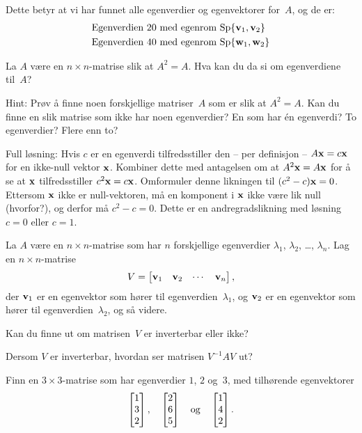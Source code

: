 \begin{losning}
\begin{punkt}
Dette betyr at vi har funnet alle egenverdier og egenvektorer for~$A$,
og de er:
\begin{align*}
&\text{Egenverdien~$20$ med egenrom $\operatorname{Sp} \{ \mathbf{v}_1, \mathbf{v}_2 \}$} \\
&\text{Egenverdien~$40$ med egenrom $\operatorname{Sp} \{ \mathbf{w}_1, \mathbf{w}_2 \}$}
\end{align*}
\end{punkt}
\end{losning}



\begin{oppgave}
La $A$ være en $n\times n$-matrise slik at $A^2=A$.
Hva kan du da si om egenverdiene til~$A$?

\noindent
Hint:
Prøv å finne noen forskjellige matriser~$A$ som er slik at $A^2 = A$.
Kan du finne en slik matrise som ikke har noen egenverdier?
En som har én egenverdi?  To egenverdier?  Flere enn to?
\end{oppgave}

\begin{losning}
Full løsning: Hvis $c$ er en egenverdi tilfredsstiller den -- per definisjon -- $A\mathbf{x}=c\mathbf{x}$ for en ikke-null vektor $\mathbf{x}$. Kombiner dette med antagelsen om at $A^2\mathbf{x}=A\mathbf{x}$ for å se at $\mathbf{x}$ tilfredsstiller $c^2\mathbf{x}=c\mathbf{x}$. Omformuler denne likningen til $(c^2-c)\mathbf{x}=0$. Ettersom $\mathbf{x}$ ikke er null-vektoren, må en komponent i $\mathbf{x}$ ikke være lik null (hvorfor?), og derfor må $c^2-c=0$. Dette er en andregradslikning med løsning $c=0$ eller $c=1$.
\end{losning}



\begin{oppgave}
La $A$ være en $n \times n$-matrise som har $n$ forskjellige
egenverdier
$\lambda_1$, $\lambda_2$, \ldots, $\lambda_n$.
Lag en $n \times n$-matrise
\[
V = \begin{bmatrix} \mathbf{v}_1 & \mathbf{v}_2 & \cdots & \mathbf{v}_n \end{bmatrix},
\]
der $\mathbf{v}_1$ er en egenvektor som hører til egenverdien~$\lambda_1$,
og $\mathbf{v}_2$ er en egenvektor som hører til egenverdien~$\lambda_2$,
og så videre.
\begin{punkt}
Kan du finne ut om matrisen~$V$ er inverterbar eller ikke?
\end{punkt}
\begin{punkt}
Dersom $V$ er inverterbar, hvordan ser matrisen $V^{-1} A V$ ut?
\end{punkt}
\begin{punkt}
Finn en $3 \times 3$-matrise som har egenverdier $1$, $2$ og~$3$, med
tilhørende egenvektorer
\[
\begin{bmatrix} 1 \\ 3 \\ 2 \end{bmatrix},\quad
\begin{bmatrix} 2 \\ 6 \\ 5 \end{bmatrix}\quad\text{og}\quad
\begin{bmatrix} 1 \\ 4 \\ 2 \end{bmatrix}.
\]
\end{punkt}
\end{oppgave}

